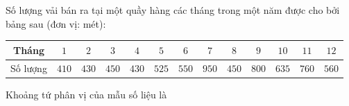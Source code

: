 \begin{ex}
Số lượng vải bán ra tại một quầy hàng các tháng trong một năm được cho bởi bảng sau (đơn vị: mét):
\begin{center}
\begin{tabular}{|c|c|c|c|c|c|c|c|c|c|c|c|c|}\hline
Tháng & $1$ & $2$ & $3$ & $4$ & $5$ & $6$ & $7$ & $8$ & $9$ & $10$ & $11$ & $12$\\\hline
Số lượng & $410$ & $430$ & $450$ & $430$ & $525$ & $550$ & $950$ & $450$ & $800$ & $635$ & $760$ & $560$\\\hline
\end{tabular}
\end{center}
Khoảng tứ phân vị của mẫu số liệu là
\end{ex}
